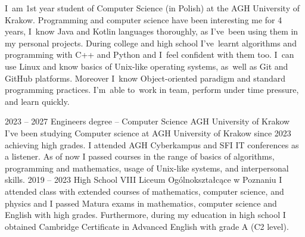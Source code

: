 \documentclass[8pt]{developercv} %
\begin{document}
\begin{minipage}[t]{0.5\textwidth} %
  \vspace{-\baselineskip}  %
  I~am 1st year student of Computer Science (in Polish) at the AGH University of Krakow.
  Programming and computer science have been interesting me for 4 years, I~know Java and Kotlin languages thoroughly,
  as I've~been using them in my personal projects.
  During college and high school I've~learnt algorithms and programming with C++ and Python and I~feel confident with them too.
  I~can use Linux and know basics of Unix-like operating systems, as~well as Git and GitHub platforms.
  Moreover I~know Object-oriented paradigm and standard programming practices.
  I'm~able to~work in team, perform under time pressure, and learn quickly.
\end{minipage}
\hfill %
\begin{minipage}[t]{0.45\textwidth} %
	\vspace{-\baselineskip}
	\begin{barchart}{5.5}
	\end{barchart}
\end{minipage}





\begin{entrylist}
  \entry
    {2023 -- 2027}
    {Engineers degree -- Computer Science}
    {AGH University of Krakow}
    {
      I've been studying Computer science at AGH University of Krakow since 2023 achieving high grades.
      I attended AGH Cyberkampus and SFI IT conferences as a listener.
      As of now I passed courses in the range of basics of algorithms, programming and mathematics, usage of Unix-like systems, and interpersonal skills.
    }
  \entry
    {2019 -- 2023}
    {High School}
    {VIII Liceum Ogólnokształcące w Poznaniu}
    {
      I attended class with extended courses of mathematics, computer science, and physics and I passed Matura exams in mathematics, computer science and English with high grades.
      Furthermore, during my education in high school I obtained Cambridge Certificate in Advanced English with grade A (C2 level).
    }
\end{entrylist}
\end{document}
